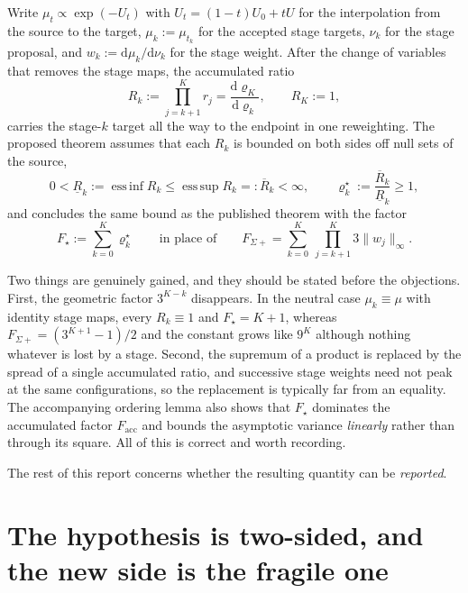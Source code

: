 \documentclass[11pt]{article}
\theoremstyle{plain}
\newcommand{\Le}{\leqslant}
\newcommand{\Ge}{\geqslant}
\newcommand{\D}{\mathrm{d}}
\newcommand{\esssup}{\operatorname*{ess\,sup}}
\newcommand{\essinf}{\operatorname*{ess\,inf}}
\begin{document}
Write $\mu_t\propto\exp(-U_t)$ with $U_t=(1-t)U_0+tU$ for the interpolation
from the source to the target, $\mu_k:=\mu_{t_k}$ for the accepted stage
targets, $\nu_k$ for the stage proposal, and $w_k:=\D\mu_k/\D\nu_k$ for the
stage weight. After the change of variables that removes the stage maps, the
accumulated ratio
\begin{equation}
    R_k:=\prod_{j=k+1}^{K}r_j=\frac{\D\varrho_K}{\D\varrho_k},
    \qquad R_K:=1,
    \label{eq: accumulated}
\end{equation}
carries the stage-$k$ target all the way to the endpoint in one reweighting.
The proposed theorem assumes that each $R_k$ is bounded on both sides off
null sets of the source,
\begin{equation}
    0<\underline R_k:=\essinf R_k \Le \esssup R_k=:\overline R_k<\infty,
    \qquad
    \varrho^\star_k:=\frac{\overline R_k}{\underline R_k}\Ge1,
    \label{eq: two-sided}
\end{equation}
and concludes the same bound as the published theorem with the factor
\begin{equation}
    F_\star:=\sum_{k=0}^{K}\varrho^\star_k
    \qquad\text{in place of}\qquad
    F_{\Sigma+}=\sum_{k=0}^{K}\ \prod_{j=k+1}^{K}3\lVert w_j\rVert_\infty .
    \label{eq: two-factors}
\end{equation}

Two things are genuinely gained, and they should be stated before the
objections. First, the geometric factor $3^{K-k}$ disappears. In the neutral
case $\mu_k\equiv\mu$ with identity stage maps, every $R_k\equiv1$ and
$F_\star=K+1$, whereas $F_{\Sigma+}=(3^{K+1}-1)/2$ and the constant grows like
$9^{K}$ although nothing whatever is lost by a stage. Second, the supremum of a
product is replaced by the spread of a single accumulated ratio, and successive
stage weights need not peak at the same configurations, so the replacement is
typically far from an equality. The accompanying ordering lemma also shows that
$F_\star$ dominates the accumulated factor $F_{\mathrm{acc}}$ and bounds the
asymptotic variance \emph{linearly} rather than through its square. All of this
is correct and worth recording.

The rest of this report concerns whether the resulting quantity can be
\emph{reported}.

\section{The hypothesis is two-sided, and the new side is the fragile one}
\end{document}
